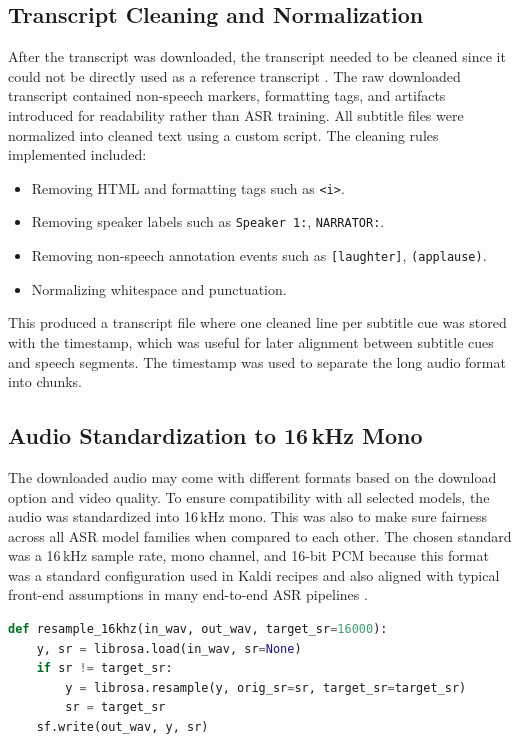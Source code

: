 \subsection{Transcript Cleaning and Normalization}
After the transcript was downloaded, the transcript needed to be cleaned since it could not be directly used as a reference transcript \parencite{ando2021}. The raw downloaded transcript contained non-speech markers, formatting tags, and artifacts introduced for readability rather than ASR training. All subtitle files were normalized into cleaned text using a custom script.
The cleaning rules implemented included:
\begin{itemize}[nosep]
    \item Removing HTML and formatting tags such as \texttt{<i>}.
    \item Removing speaker labels such as \texttt{Speaker 1:}, \texttt{NARRATOR:}.
    \item Removing non-speech annotation events such as \texttt{[laughter]}, \texttt{(applause)}.
    \item Normalizing whitespace and punctuation.
\end{itemize}
\vspace{1em}
This produced a transcript file where one cleaned line per subtitle cue was stored with the timestamp, which was useful for later alignment between subtitle cues and speech segments. The timestamp was used to separate the long audio format into chunks.

\subsection{Audio Standardization to 16\,kHz Mono}
The downloaded audio may come with different formats based on the download option and video quality. To ensure compatibility with all selected models, the audio was standardized into 16\,kHz mono. This was also to make sure fairness across all ASR model families when compared to each other. The chosen standard was a 16\,kHz sample rate, mono channel, and 16-bit PCM because this format was a standard configuration used in Kaldi recipes and also aligned with typical front-end assumptions in many end-to-end ASR pipelines \parencite{kaldi2011}.

\break
\begin{lstlisting}[language=Python, caption={Audio resampling to 16 kHz}, label={lst:resample-16khz}]
def resample_16khz(in_wav, out_wav, target_sr=16000):
    y, sr = librosa.load(in_wav, sr=None)          
    if sr != target_sr:
        y = librosa.resample(y, orig_sr=sr, target_sr=target_sr)
        sr = target_sr
    sf.write(out_wav, y, sr)                       
\end{lstlisting}

